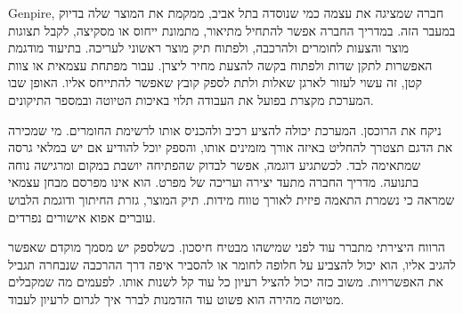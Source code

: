 


{\fontsize{14}{21.3}\selectfont

\textenglish{Genpire}, חברה שמציגה את עצמה כמי שנוסדה בתל אביב, ממקמת את המוצר שלה בדיוק במעבר הזה. במדריך החברה אפשר להתחיל מתיאור, מתמונת ייחוס או מסקיצה, לקבל תצוגות מוצר והצעות לחומרים ולהרכבה, ולפתוח תיק מוצר ראשוני לעריכה. בתיעוד מודגמת האפשרות לתקן שדות ולפתוח בקשה להצעת מחיר ליצרן. עבור מפתחת עצמאית או צוות קטן, זה עשוי לעזור לארגן שאלות ולתת לספק קובץ שאפשר להתייחס אליו. האופן שבו המערכת מקצרת בפועל את העבודה תלוי באיכות הטיוטה ובמספר התיקונים. 

ניקח את הרוכסן. המערכת יכולה להציע רכיב ולהכניס אותו לרשימת החומרים. מי שמכירה את הדגם תצטרך להחליט באיזה אורך מזמינים אותו, והספק יוכל להודיע אם יש במלאי גרסה שמתאימה לבד. לכשתגיע דוגמה, אפשר לבדוק שהפתיחה יושבת במקום ומרגישה נוחה בתנועה. מדריך החברה מתעד יצירה ועריכה של מפרט. הוא אינו מפרסם מבחן עצמאי שמראה כי נשמרת התאמה פיזית לאורך טווח מידות. תיק המוצר, גזרת החיתוך ודוגמת הלבוש עוברים אפוא אישורים נפרדים. 

הרווח היצירתי מתברר עוד לפני שמישהו מבטיח חיסכון. כשלספק יש מסמך מוקדם שאפשר להגיב אליו, הוא יכול להצביע על חלופה לחומר או להסביר איפה דרך ההרכבה שנבחרה תגביל את האפשרויות. משוב כזה יכול להציל רעיון כל עוד קל לשנות אותו. לפעמים מה שמקבלים מטיוטה מהירה הוא פשוט עוד הזדמנות לברר איך לגרום לרעיון לעבוד.

\par}

